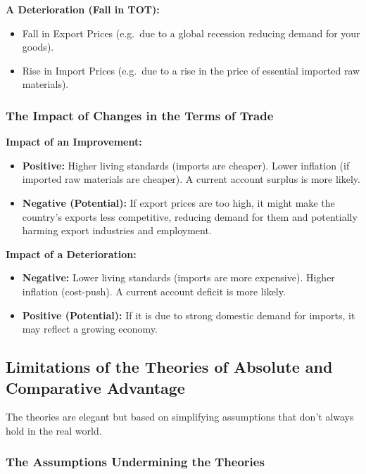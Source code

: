 \documentclass[11pt, a4paper, twoside]{book}
\begin{document}
\textbf{A Deterioration (Fall in TOT):}
\begin{itemize}
  \item Fall in Export Prices (e.g.\ due to a global recession reducing demand for your goods).
  \item Rise in Import Prices (e.g.\ due to a rise in the price of essential imported raw materials).
\end{itemize}

\subsubsection{The Impact of Changes in the Terms of Trade}

\textbf{Impact of an Improvement:}
\begin{itemize}
  \item \textbf{Positive:} Higher living standards (imports are cheaper). Lower inflation (if imported raw materials are cheaper). A current account surplus is more likely.
  \item \textbf{Negative (Potential):} If export prices are too high, it might make the country's exports less competitive, reducing demand for them and potentially harming export industries and employment.
\end{itemize}

\textbf{Impact of a Deterioration:}
\begin{itemize}
  \item \textbf{Negative:} Lower living standards (imports are more expensive). Higher inflation (cost-push). A current account deficit is more likely.
  \item \textbf{Positive (Potential):} If it is due to strong domestic demand for imports, it may reflect a growing economy.
\end{itemize}

\subsection{Limitations of the Theories of Absolute and Comparative Advantage}

The theories are elegant but based on simplifying assumptions that don't always hold in the real world.

\subsubsection{The Assumptions Undermining the Theories}
\end{document}
